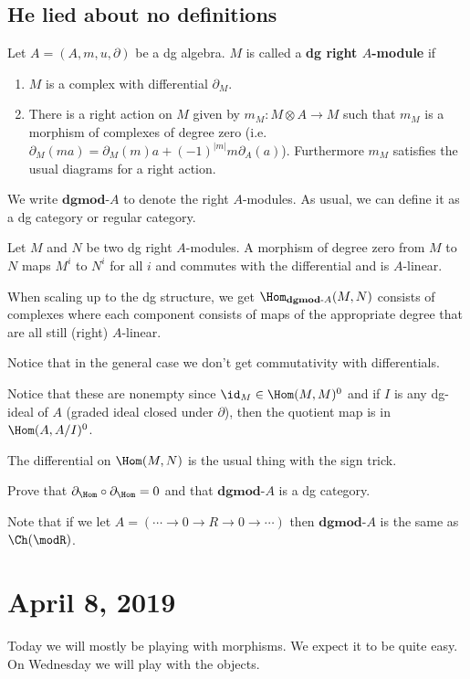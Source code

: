 \documentclass[12pt]{article}
\newcommand*{\dgmodA}{\mathbf{dgmod}\text{-}A}
\begin{document}
\subsection{He lied about no definitions}
\begin{defn}
	Let $A=(A,m,u,\partial)$ be a dg algebra. $M$ is called a \textbf{dg right $A$-module} if 
	\begin{enumerate}
		\item $M$ is a complex with differential $\partial_M$. 
		\item There is a right action on $M$ given by $m_M:M\otimes A\to M$ such that $m_M$ is a morphism
		of complexes of degree zero (i.e. $\partial_M(ma)=\partial_M(m)a+(-1)^{|m|}m\partial_A(a)$). Furthermore
		$m_M$ satisfies the usual diagrams for a right action.
	\end{enumerate}
\end{defn}
\begin{rmk}
	We write $\dgmodA$ to denote the right $A$-modules. As usual, we can define it as a dg category
	or regular category.

	Let $M$ and $N$ be two dg right $A$-modules. A morphism of degree zero from $M$ to $N$ maps
	$M^i$ to $N^i$ for all $i$ and commutes with the differential and is $A$-linear.

	When scaling up to the dg structure, we get $\Hom_{\dgmodA}(M,N)$ consists of complexes where each 
	component consists of maps of the appropriate degree that are all still (right) $A$-linear.

	Notice that in the general case we don't get commutativity with differentials.
\end{rmk}
\begin{rmk}
	Notice that these are nonempty since $\id_M\in\Hom(M,M)^0$ and if $I$ is any dg-ideal  of $A$
	(graded ideal closed under $\partial$), then the quotient map is in $\Hom(A,A/I)^0$.
\end{rmk}
The differential on $\Hom(M,N)$ is the usual thing with the sign trick.
\begin{prob}
	Prove that $\partial_{\Hom}\circ \partial_{\Hom}=0$ and that $\dgmodA$ is a dg category.
\end{prob}

Note that if we let $A=(\cdots\to 0\to R\to 0\to \cdots)$ then $\dgmodA$ is the same as $\Ch(\modR)$.

\section{April 8, 2019}
Today we will mostly be playing with morphisms. We expect it to be quite easy. On Wednesday we will play with the objects.
\end{document}

